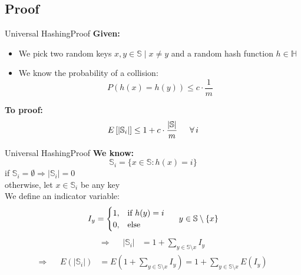 \subsection{Proof}

\begin{frame}{Universal Hashing}{Proof}
  \textbf{Given:}
  \begin{itemize}
    \item<1->
      We pick two random keys {\color{Mittel-Blau}$x, y \in \mathbb{S} \mid x \neq y$} and
      a random hash function {\color{Mittel-Blau}$h \in \mathbb{H}$}
    \item<2->
      We know the probability of a collision:
      {\color{Mittel-Blau}\[P(h(x) = h(y)) \leq c \cdot \frac{1}{m}\]}
  \end{itemize}
  \textbf{To proof:}
  {\color{Mittel-Blau}\[E\left[\vert \mathbb{S}_i \vert\right]
     \leq 1 + c \cdot \frac{\vert \mathbb{S} \vert}{m}
     \hspace*{1.5em} \forall \, i\]}
\end{frame}


\begin{frame}{Universal Hashing}{Proof}
  \textbf{We know:}
         {\color{Mittel-Blau}\[\mathbb{S}_i = \{x \in \mathbb{S}: h(x) = i\}\]}
         if {\color{Mittel-Blau}$\mathbb{S}_i = \emptyset \Rightarrow  \vert \mathbb{S}_i \vert = 0$}\\
         otherwise, let {\color{Mittel-Blau}$x \in \mathbb{S}_i$ be any key}\\
  We define an indicator variable:
  {\color{Mittel-Blau}
  \begin{displaymath}
    I_y = \begin{cases}
      1, & \text{if } h(y) = i\\
      0, & \text{else}
    \end{cases} \hspace*{1.5em} y \in \mathbb{S} \setminus \{x\}
  \end{displaymath}
  \begin{align*}
    \Rightarrow && \vert \mathbb{S}_i \vert
    & = 1 + \sum_{y \in \mathbb{S} \setminus x} I_y
  \end{align*}
  \begin{align*}
    \Rightarrow && E\left(\vert \mathbb{S}_i \vert\right)
      & = E\left(1 + \sum_{y \in \mathbb{S} \setminus x} I_y\right)
        = 1 + \sum_{y \in \mathbb{S} \setminus x} E(I_y)
  \end{align*}}
\end{frame}

